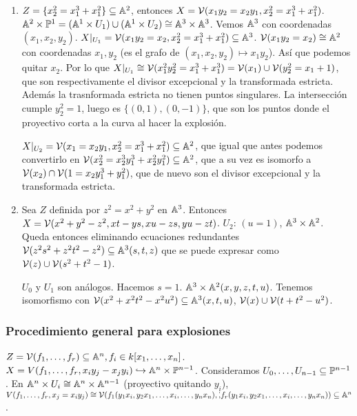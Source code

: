 \documentclass[ACGA.tex]{subfiles}
\begin{document}
\begin{ejs}
\begin{enumerate}
\item $Z=\{x_2^2=x_1^3+x_1^2\}\subseteq\mathbb{A}^2$, entonces $X=\mathcal{V}(x_1y_2=x_2y_1,x_2^2=x_1^3+x_1^2)$. $\mathbb{A}^2\times\mathbb{P}^1=(\mathbb{A}^1\times U_1)\cup(\mathbb{A}^1\times U_2)\cong \mathbb{A}^3\times\mathbb{A}^3$. Vemos $\mathbb{A}^3$ con coordenadas $(x_1,x_2,y_2)$. $X|_{U_1}=\mathcal{V}(x_1y_2=x_2,x_2^2=x_1^3+x_1^2)\subseteq\mathbb{A}^3$. $\mathcal{V}(x_1y_2=x_2)\cong\mathbb{A}^2$ con coordenadas $x_1,y_2$ (es el grafo de $(x_1,x_2,y_2)\mapsto x_1y_2$). Así que podemos quitar $x_2$. Por lo que $X|_{U_1}\cong \mathcal{V}(x_1^2y_2^2=x_1^3+x_1^3)=\mathcal{V}(x_1)\cup \mathcal{V}(y_2^2=x_1+1)$, que son respectivamente el divisor excepcional y la transformada estricta. Además la trasnformada estricta no tienen puntos singulares. La intersección cumple $y_2^2=1$, luego es $\{(0,1),(0,-1)\}$, que son los puntos donde el proyectivo corta a la curva al hacer la explosión.

$X|_{U_2}=\mathcal{V}(x_1=x_2y_1,x_2^2=x_1^3+x_1^2)\subseteq\mathbb{A}^2$, que igual que antes podemos convertirlo en $\mathcal{V}(x_2^2=x_2^3y_1^3+x_2^2y_1^2)\subseteq\mathbb{A}^2$, que a su vez es isomorfo a $\mathcal{V}(x_2)\cap\mathcal{V}(1=x_2y_1^3+y_1^2)$, que de nuevo son el divisor excepcional y la transformada estricta.

\item Sea $Z$ definida por $z^2=x^2+y^2$ en $\mathbb{A}^3$. Entonces $X=\mathcal{V}(x^2+y^2-z^2, xt-ys, xu-zs,yu-zt)$. $U_2$: $(u=1)$, $\mathbb{A}^3\times\mathbb{A}^2$. Queda entonces eliminando ecuaciones redundantes $\mathcal{V}(z^2s^2+z^2t^2-z^2)\subseteq\mathbb{A}^3(s,t,z)$ que se puede expresar como $\mathcal{V}(z)\cup\mathcal{V}(s^2+t^2-1)$. 

$U_0$ y $U_1$ son análogos. Hacemos $s=1$. $\mathbb{A}^3\times\mathbb{A}^2(x,y,z,t,u)$. Tenemos isomorfismo con $\mathcal{V}(x^2+x^2t^2-x^2u^2)\subseteq\mathbb{A}^3(x,t,u)$, $\mathcal{V}(x)\cup\mathcal{V}(t+t^ 2-u^2)$.

\end{enumerate}
\end{ejs}


\subsubsection{Procedimiento general para explosiones}

$Z=\mathcal{V}(f_1,\dots,f_r)\subseteq\mathbb{A}^n, f_i\in k[x_1,\dots,x_n]$. $X=V(f_1,\dots,f_r,x_iy_j-x_jy_i)\hookrightarrow\mathbb{A}^n\times\mathbb{P}^{n-1}$. Consideramos $U_0,\dots,U_{n-1}\subseteq\mathbb{P}^{n-1}$. En $\mathbb{A}^n\times U_i\cong \mathbb{A}^n\times\mathbb{A}^{n-1}$ (proyectivo quitando $y_i$), $V(f_1,\dots,f_r,x_j=x_iy_j)\cong\mathcal{V}(f_1(y_1x_i,y_2x_1,\dots, x_i,\dots, y_nx_n),\dot,f_r(y_1x_i,y_2x_1,\dots, x_i,\dots, y_nx_n))\subseteq\mathbb{A}^n$.
\end{document}

